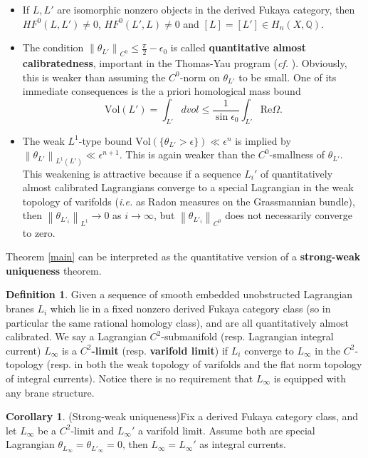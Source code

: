\documentclass[a4paper]{article}
\theoremstyle{definition}
\newtheorem{cor}[thm]{Corollary}
\newtheorem{Def}[thm]{Definition}
\newcommand{\ie}{\emph{i.e.} }
\newcommand{\cf}{\emph{cf.} }
\newcommand{\Q}{\mathbb{Q}}
\newcommand{\norm}[1]{\left\lVert#1\right\rVert}
\begin{document}
\begin{itemize}
\item If $L,L'$ are isomorphic nonzero objects in the derived Fukaya category, then $HF^0(L,L')\neq 0$, $HF^0(L',L)\neq 0$ and $[L]=[L']\in H_n(X, \Q)$. 


\item The condition $\norm{\theta_{L'}}_{C^0}\leq \frac{\pi}{2}-\epsilon_0$ is called \textbf{quantitative almost calibratedness}, important in the Thomas-Yau program (\cf \cite{ThomasYau}\cite{Li}). Obviously, this is weaker than assuming the $C^0$-norm on $\theta_{L'}$ to be small. One of its immediate consequences is the a priori homological mass bound
\[
\text{Vol}(L')=\int_{L'} dvol \leq \frac{1}{\sin \epsilon_0} \int_{L'} \text{Re}\Omega .
\]


\item The weak $L^1$-type bound $\text{Vol}(\{ \theta_{L'}>\epsilon \})\ll \epsilon^n$
 is implied by $\norm{\theta_{L'} }_{L^1(L')} \ll \epsilon^{n+1} $. This is again weaker than the $C^0$-smallness of $\theta_{L'}$. This weakening is attractive because if a sequence $L_i'$ of quantitatively almost calibrated Lagrangians converge to a special Lagrangian in the weak topology of varifolds (\ie as Radon measures on the Grassmannian bundle), then $\norm{\theta_{L'_i} }_{L^1}\to 0$ as $i\to \infty$, but $\norm{\theta_{L'_i}}_{C^0}$ does not necessarily converge to zero.
\end{itemize}





Theorem \ref{main} can be interpreted as the quantitative version of a 
\textbf{strong-weak uniqueness} theorem. 

\begin{Def}
Given a sequence of smooth embedded unobstructed Lagrangian branes $L_i$ which lie in a fixed nonzero derived Fukaya category class (so in particular the same rational homology class), and are all quantitatively almost calibrated. We say a Lagrangian $C^2$-submanifold (resp. Lagrangian integral current) $L_\infty$ is a \textbf{$C^2$-limit} (resp. \textbf{varifold limit}) if $L_i$ converge to $L_\infty$ in the $C^2$-topology (resp. in both the weak topology of varifolds and the flat norm topology of integral currents). Notice there is no requirement that $L_\infty$ is equipped with any brane structure. 
\end{Def} 




\begin{cor}(Strong-weak uniqueness)\label{strongweak} Fix a derived Fukaya category class, and let $L_\infty$ be a $C^2$-limit and $L_\infty'$ a varifold limit. Assume both are special Lagrangian $\theta_{L_\infty}=\theta_{L'_\infty}=0$, then $L_\infty=L_\infty'$ as integral currents.
\end{cor}
\end{document}
